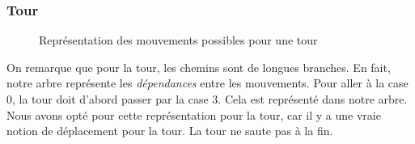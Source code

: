 \subsubsection{Tour}
\begin{figure}[H]
    \centering
    \hspace{1.5em}
    \caption{Représentation des mouvements possibles pour une tour}
\end{figure}
On remarque que pour la tour, les chemins sont de longues branches.
En fait, notre arbre représente les \emph{dépendances} entre les mouvements.
Pour aller à la case 0, la tour doit d'abord passer par la case 3. Cela est représenté dans notre
arbre. Nous avons opté pour cette représentation pour la tour, car il y a
une vraie notion de déplacement pour la tour. La tour ne saute pas à la fin.


